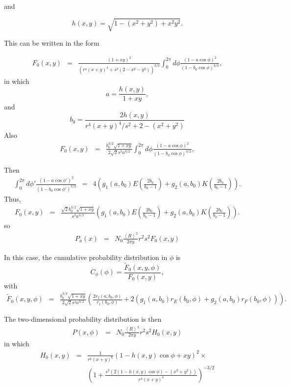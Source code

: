\documentclass[11pt,openany]{report}
\begin{document}
{{and

$$h(x,y)=\sqrt{1-(x^{2}+y^{2})+x^{2}y^{2}}.$$

This can be written in the form

\begin{eqnarray} F_{0}(x,y)&=&\frac{(1+xy)^{2}}{\left(r^{4}(x+y)^{4}+s^{2}(2-x^{2}-y^{2})\right)^{3/2}}\int_{0}^{2\pi}d\phi\frac{\left(1-a\cos\phi \right)^{2}}{(1-b_0\cos\phi)^{3/2}},
\end{eqnarray}
in which 
$$a=\frac{h(x,y)}{1+xy},$$
and
$$b_0=\frac{2h(x,y)}{r^{4}(x+y)^{4}/s^{2}+2-(x^{2}+y^{2})}$$
Also
\begin{eqnarray} F_{0}(x,y)&=&\frac{b_{0}^{3/2}\sqrt{1+xy}}{2\sqrt{2}s^{3}a^{3/2}}\int_{0}^{2\pi}d\phi\frac{\left(1-a\cos\phi \right)^{2}}{(1-b_0\cos\phi)^{3/2}},
\end{eqnarray}

Then
\begin{eqnarray}
\int_{0}^{2\pi}d\phi'\frac{\left(1-a\cos\phi' \right)^{2}}{(1-b_0\cos\phi')^{3/2}}&=&
4\left(g_{1}(a,b_0)E\left(\frac{2b_0}{b_0-1}\right)+g_{2}(a,b_0)K\left(\frac{2b_0}{b_0-1}\right)\right).
\end{eqnarray}
Thus, 
\begin{eqnarray} F_{0}(x,y)&=&\frac{\sqrt{2}b_{0}^{3/2}\sqrt{1+xy}}{s^{3}a^{3/2}}\left(g_{1}(a,b_0)E\left(\frac{2b_0}{b_0-1}\right)+g_{2}(a,b_0)K\left(\frac{2b_0}{b_0-1}\right)\right).
\end{eqnarray}
so
\begin{eqnarray}
P_{x}(x)&=&N_{0}\frac{\left<R\right>^{2}}{2\pi y}
r^{2}s^{2}
F_{0}(x,y)
\end{eqnarray}

In this case, the cumulative probability distribution in $\phi$ is 
  $$C_{\phi}(\phi)=\frac{\tilde F_{0}(x,y,\phi)}{ F_{0}(x,y)},$$
with
\begin{eqnarray}
\tilde F_{0}(x,y,\phi)&=&\frac{b_{0}^{3/2}\sqrt{1+xy}}{2\sqrt{2}s^{3}a^{3/2}}\left(
\frac{2r_{2}(a,b_0,\phi)}{r_{1}(b_0,\phi)}+2(g_{1}(a,b_0)r_{E}(b_0,\phi)+g_{2}(a,b_0)r_{F}(b_0,\phi))\right).
\end{eqnarray}

The two-dimensional probability distribution is then
\begin{eqnarray}
P(x,\phi)&=&N_{0}\frac{\left<R\right>^{2}}{2\pi y}
r^{2}s^{2}
H_{0}(x,y)
\end{eqnarray}
in which
\begin{eqnarray} H_{0}(x,y)&=&\frac{1}{r^{6}(x+y)^{6}}\left(1-h(x,y)\cos\phi +xy\right)^{2}\times\\
&&\left(1+\frac{s^{2}\left(2(1-h(x,y)\cos\phi) -(x^{2}+y^{2})\right)}{r^{4}(x+y)^{4}}\right)^{-3/2}
\end{eqnarray}

}}
\end{document}
